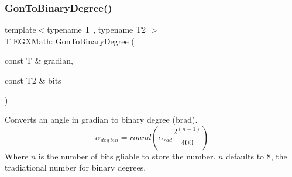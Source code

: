 \subsubsection{\texorpdfstring{Gon\+To\+Binary\+Degree()}{GonToBinaryDegree()}}
{\footnotesize\ttfamily template$<$typename T , typename T2 $>$ \\
T E\+G\+X\+Math\+::\+Gon\+To\+Binary\+Degree (\begin{DoxyParamCaption}\item[{const T \&}]{gradian,  }\item[{const T2 \&}]{bits = {} }\end{DoxyParamCaption})}



Converts an angle in gradian to binary degree (brad). \[\alpha_{deg\ bin}=round(\alpha_{rad}\frac{2^{(n-1)}}{400})\] Where $n$ is the number of bits gliable to store the number. $n$ defaults to 8, the tradiational number for binary degrees. 

